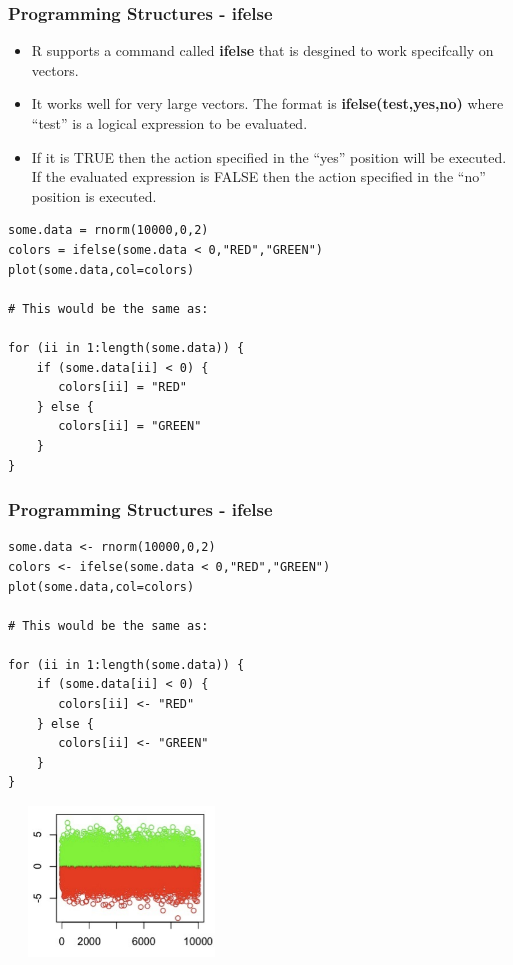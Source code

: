 \documentclass{beamer}
\begin{document}
\begin{frame}[fragile]
\frametitle{Programming Structures - ifelse}
\begin{itemize}
\item R supports a command called \textbf{ifelse} that is desgined to work specifcally on vectors. 

\item It works well for very large vectors. The format is \textbf{ifelse(test,yes,no)} where
``test'' is a logical expression to be evaluated. 

\item If it is TRUE then the action specified in the ``yes'' position will be executed. If the evaluated expression is FALSE then the action specified in the ``no'' position is executed.
\end{itemize}
\footnotesize
\begin{verbatim}
some.data = rnorm(10000,0,2)
colors = ifelse(some.data < 0,"RED","GREEN")
plot(some.data,col=colors)

# This would be the same as:

for (ii in 1:length(some.data)) {
    if (some.data[ii] < 0) {
       colors[ii] = "RED"
    } else {
       colors[ii] = "GREEN"
    }
}
\end{verbatim}
\end{frame}

%

\begin{frame}[fragile]
\frametitle{Programming Structures - ifelse}
\scriptsize
\begin{verbatim}
some.data <- rnorm(10000,0,2)
colors <- ifelse(some.data < 0,"RED","GREEN")
plot(some.data,col=colors)

# This would be the same as:

for (ii in 1:length(some.data)) {
    if (some.data[ii] < 0) {
       colors[ii] <- "RED"
    } else {
       colors[ii] <- "GREEN"
    }
}
\end{verbatim}
\begin{center}
\includegraphics[height=4cm,width=6cm]{../IMG/greenred.png}
\end{center}
\end{frame}
\end{document}
